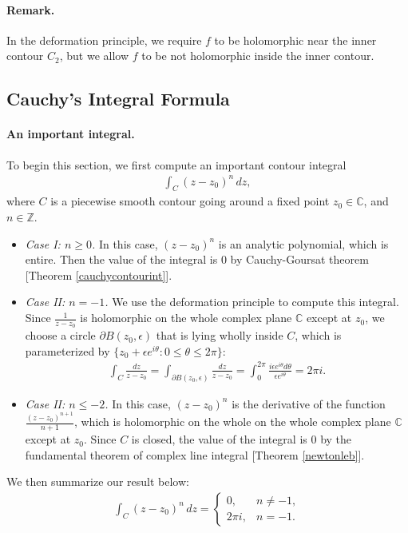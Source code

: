 \documentclass{article}
\numberwithin{equation}{section}
\newcommand{\bbC}{\mathbb{C}}
\newcommand{\bbZ}{\mathbb{Z}}
\theoremstyle{plain}
\theoremstyle{definition}
\begin{document}
\paragraph{Remark.} In the deformation principle, we require $f$ to be holomorphic near the inner contour $C_2$, but we allow $f$ to be not holomorphic inside the inner contour.

\subsection{Cauchy's Integral Formula}
\paragraph{An important integral.} To begin this section, we first compute an important contour integral
\begin{align*}
	\int_C (z-z_0)^n\,dz,
\end{align*}
where $C$ is a piecewise smooth contour going around a fixed point $z_0\in\bbC$, and $n\in\bbZ$.
\begin{itemize}
\item\textit{Case I: $n\geq 0$.} In this case, $(z-z_0)^n$ is an analytic polynomial, which is entire. Then the value of the integral is $0$ by Cauchy-Goursat theorem [Theorem \ref{cauchycontourint}].
\item\textit{Case II: $n=-1$.} We use the deformation principle to compute this integral. Since $\frac{1}{z-z_0}$ is holomorphic on the whole complex plane $\bbC$ except at $z_0$, we choose a circle $\partial B(z_0,\epsilon)$ that is lying wholly inside $C$, which is parameterized by $\{z_0+\epsilon e^{i\theta}:0\leq\theta\leq 2\pi\}$:
\begin{align*}
	\int_C\frac{dz}{z-z_0}=\int_{\partial B(z_0,\epsilon)}\frac{dz}{z-z_0}=\int_0^{2\pi}\frac{i\epsilon e^{i\theta}d\theta}{\epsilon e^{i\theta}}=2\pi i.
\end{align*}
\item\textit{Case II: $n\leq -2$.} In this case, $(z-z_0)^n$ is the derivative of the function $\frac{(z-z_0)^{n+1}}{n+1}$, which is holomorphic on the whole on the whole complex plane $\bbC$ except at $z_0$. Since $C$ is closed, the value of the integral is $0$ by the fundamental theorem of complex line integral [Theorem \ref{newtonleb}].
\end{itemize}
We then summarize our result below:
\begin{align*}
	\int_C(z-z_0)^n\,dz=\begin{cases}
		0, & n\neq -1,\\
		2\pi i, & n=-1.
	\end{cases}
\end{align*}
\end{document}
